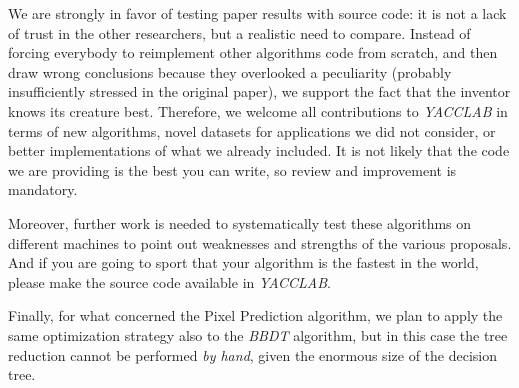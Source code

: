 We are strongly in favor of testing paper results with source code: it is not a lack of trust in the other researchers, but a realistic need to compare. Instead of forcing everybody to reimplement other algorithms code from scratch, and then draw wrong conclusions because they overlooked a peculiarity (probably insufficiently stressed in the original paper), we support the fact that the inventor knows its creature best. Therefore, we welcome all contributions to \textit{YACCLAB} in terms of new algorithms, novel datasets for applications we did not consider, or better implementations of what we already included. It is not likely that the code we are providing is the best you can write, so review and improvement is mandatory. 

Moreover, further work is needed to systematically test these algorithms on different machines to point out weaknesses and strengths of the various proposals. And if you are going to sport that your algorithm is the fastest in the world, please make the source code available in \textit{YACCLAB}.

Finally, for what concerned the Pixel Prediction algorithm, we plan to apply the same optimization strategy also to the \textit{BBDT} algorithm, but in this case the tree reduction cannot be performed \emph{by hand}, given the enormous size of the decision tree. 
